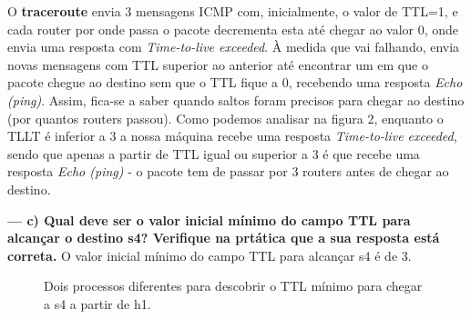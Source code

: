 \documentclass[a4paper]{article}
\begin{document}
O \textbf{traceroute} envia 3 mensagens ICMP com, inicialmente, o valor de TTL=1, e cada router por onde passa o pacote decrementa esta até chegar ao valor 0, onde envia uma resposta com \textit{Time-to-live exceeded}. À medida que vai falhando, envia novas mensagens com TTL superior ao anterior até encontrar um em que o pacote chegue ao destino sem que o TTL fique a 0, recebendo uma resposta \textit{Echo (ping)}. Assim, fica-se a saber quando saltos foram precisos para chegar ao destino (por quantos routers passou).\newline
Como podemos analisar na figura 2, enquanto o TLLT é inferior a 3 a nossa máquina recebe uma resposta \textit{Time-to-live exceeded}, sendo que apenas a partir de TTL igual ou superior a 3 é que recebe uma resposta \textit{Echo (ping)} - o pacote tem de passar por 3 routers antes de chegar ao destino.

\newpage

\textbf{--- c) Qual deve ser o valor inicial mínimo do campo TTL para alcançar o destino s4? Verifique na prtática que a sua resposta está correta.}\newline
O valor inicial mínimo do campo TTL para alcançar s4 é de 3.
\begin{figure}[ht]%
    \centering
    \qquad
    \caption{Dois processos diferentes para descobrir o TTL mínimo para chegar a s4 a partir de h1.}%
    \label{fig:example}%
\end{figure}
\end{document}
